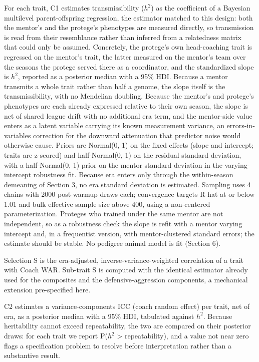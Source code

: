 \documentclass[11pt]{article}
\begin{document}
For each trait, C1 estimates transmissibility ($h^{2}$) as the coefficient of a Bayesian multilevel parent-offspring regression, the estimator matched to this design: both the mentor's and the protege's phenotypes are measured directly, so transmission is read from their resemblance rather than inferred from a relatedness matrix that could only be assumed. Concretely, the protege's own head-coaching trait is regressed on the mentor's trait, the latter measured on the mentor's team over the seasons the protege served there as a coordinator, and the standardized slope is $h^{2}$, reported as a posterior median with a 95\% HDI. Because a mentor transmits a whole trait rather than half a genome, the slope itself is the transmissibility, with no Mendelian doubling. Because the mentor's and protege's phenotypes are each already expressed relative to their own season, the slope is net of shared league drift with no additional era term, and the mentor-side value enters as a latent variable carrying its known measurement variance, an errors-in-variables correction for the downward attenuation that predictor noise would otherwise cause. Priors are Normal(0, 1) on the fixed effects (slope and intercept; traits are z-scored) and half-Normal(0, 1) on the residual standard deviation, with a half-Normal(0, 1) prior on the mentor standard deviation in the varying-intercept robustness fit. Because era enters only through the within-season demeaning of Section 3, no era standard deviation is estimated. Sampling uses 4 chains with 2000 post-warmup draws each; convergence targets R-hat at or below 1.01 and bulk effective sample size above 400, using a non-centered parameterization. Proteges who trained under the same mentor are not independent, so as a robustness check the slope is refit with a mentor varying intercept and, in a frequentist version, with mentor-clustered standard errors; the estimate should be stable. No pedigree animal model is fit (Section 6).

Selection S is the era-adjusted, inverse-variance-weighted correlation of a trait with Coach WAR. Sub-trait S is computed with the identical estimator already used for the composites and the defensive-aggression components, a mechanical extension pre-specified here.

C2 estimates a variance-components ICC (coach random effect) per trait, net of era, as a posterior median with a 95\% HDI, tabulated against $h^{2}$. Because heritability cannot exceed repeatability, the two are compared on their posterior draws: for each trait we report P($h^{2}$ \textgreater{} repeatability), and a value not near zero flags a specification problem to resolve before interpretation rather than a substantive result.
\end{document}
